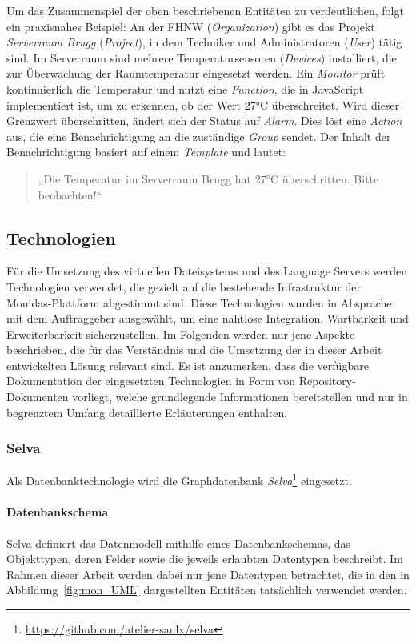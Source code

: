 Um das Zusammenspiel der oben beschriebenen Entitäten zu verdeutlichen, folgt ein praxisnahes Beispiel:  
An der FHNW (\textit{Organization}) gibt es das Projekt \textit{Serverraum Brugg} (\textit{Project}), in dem Techniker und Administratoren (\textit{User}) tätig sind. Im Serverraum sind mehrere Temperatursensoren (\textit{Devices}) installiert, die zur Überwachung der Raumtemperatur eingesetzt werden. Ein \textit{Monitor} prüft kontinuierlich die Temperatur und nutzt eine \textit{Function}, die in JavaScript implementiert ist, um zu erkennen, ob der Wert 27°C überschreitet.  
Wird dieser Grenzwert überschritten, ändert sich der Status auf \textit{Alarm}. Dies löst eine \textit{Action} aus, die eine Benachrichtigung an die zuständige \textit{Group} sendet. Der Inhalt der Benachrichtigung basiert auf einem \textit{Template} und lautet:

\begin{quote}
  „Die Temperatur im Serverraum Brugg hat 27°C überschritten. Bitte beobachten!“
\end{quote}


\subsection{Technologien}
\label{abb:tech}
Für die Umsetzung des virtuellen Dateisystems und des Language Servers werden Technologien verwendet, die gezielt auf die bestehende Infrastruktur der Monidas-Plattform abgestimmt sind. Diese Technologien wurden in Absprache mit dem Auftraggeber ausgewählt, um eine nahtlose Integration, Wartbarkeit und Erweiterbarkeit sicherzustellen. Im Folgenden werden nur jene Aspekte beschrieben, die für das Verständnis und die Umsetzung der in dieser Arbeit entwickelten Lösung relevant sind. Es ist anzumerken, dass die verfügbare Dokumentation der eingesetzten Technologien in Form von Repository-Dokumenten vorliegt, welche grundlegende Informationen bereitstellen und nur in begrenztem Umfang detaillierte Erläuterungen enthalten.

\subsubsection*{Selva}

Als Datenbanktechnologie wird die Graphdatenbank \textit{Selva}\footnote{\url{https://github.com/atelier-saulx/selva}} eingesetzt.

\paragraph{Datenbankschema}
Selva definiert das Datenmodell mithilfe eines Datenbankschemas, das Objekttypen, deren Felder sowie die jeweils erlaubten Datentypen beschreibt. Im Rahmen dieser Arbeit werden dabei nur jene Datentypen betrachtet, die in den in Abbildung~\ref{fig:mon_UML} dargestellten Entitäten tatsächlich verwendet werden.

